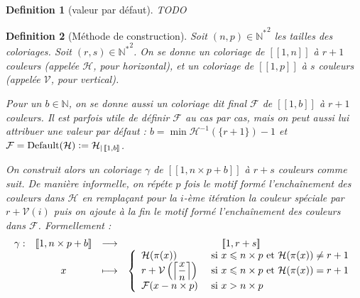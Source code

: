 \documentclass{article}
\newtheorem{definition}{Definition}[section]
\DeclareMathOperator{\findef}{Default}
\newcommand{\defeq}{\vcentcolon=}
\begin{document}
\begin{definition}[valeur par défaut]
TODO
\end{definition}

\begin{definition}[Méthode de construction]
Soit \((n, p) \in {\mathbb{N}^*}^2\) les tailles des coloriages. Soit \((r, s) \in {\mathbb{N}^*}^2\). On se donne un coloriage de \([\![1, n]\!]\) à \(r + 1\) couleurs (appelée \(\mathcal{H}\), pour horizontal), et un coloriage de \([\![1, p]\!]\) à \(s\) couleurs (appelée \(\mathcal{V}\), pour vertical).

Pour un \(b \in \mathbb{N}\), on se donne aussi un coloriage dit final \(\mathcal{F}\) de \([\![1, b]\!]\) à \(r + 1\) couleurs. Il est parfois utile de définir \(\mathcal{F}\) au cas par cas, mais on peut aussi lui attribuer une valeur par défaut : \(b = \min \mathcal{H}^{-1}(\{r + 1\}) - 1\) et \(\mathcal{F} = \findef(\mathcal{H}) \defeq \mathcal{H}_{|\,[\![1, b]\!]}\). 

On construit alors un coloriage \(\gamma\) de \([\![1, n \times p + b]\!]\) à \(r + s\) couleurs comme suit. De manière informelle, on répéte \(p\) fois le motif formé l'enchaînement des couleurs dans \(\mathcal{H}\) en remplaçant pour la \(i\)-ème itération la couleur spéciale par \(r + \mathcal{V}(i)\) puis on ajoute à la fin le motif formé l'enchaînement des couleurs dans \(\mathcal{F}\). Formellement :
\[\begin{array}{c c c c}
	\gamma: & [\![1, n \times p + b]\!]  & \longrightarrow &  [\![1, r + s]\!] \\
 	& x & \longmapsto & 
		\left\{\begin{array}{l l}
			\mathcal{H}(\pi(x)) & ~\text{si}~ x \leqslant n \times p ~\text{et}~ \mathcal{H}(\pi(x)) \neq r + 1 \\
			r + \mathcal{V}\left(\left\lceil \dfrac{x}{n} \right\rceil\right) & ~\text{si}~ x \leqslant n \times p ~\text{et}~ \mathcal{H}(\pi(x)) = r + 1 \\
			\mathcal{F}(x - n \times p) & ~\text{si}~ x > n \times p
		\end{array}\right.
\end{array}\]
\end{definition}
\end{document}

